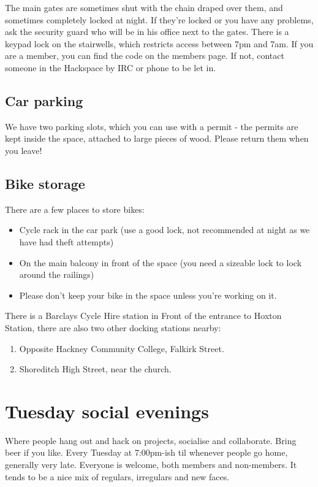 \documentclass[11pt,a5paper,twoside]{memoir}
\begin{document}
The main gates are sometimes shut with the chain draped over them, and sometimes completely locked at night. If they're locked or you have any problems, ask the security guard who will be in his office next to the gates. There is a keypad lock on the stairwells, which restricts access between 7pm and 7am. If you are a member, you can find the code on the members page. If not, contact someone in the Hackspace by IRC or phone to be let in.

\subsection{Car parking}

We have two parking slots, which you can use with a permit - the permits are kept inside the space, attached to large pieces of wood. Please return them when you leave!

\subsection{Bike storage}

There are a few places to store bikes:

\begin{itemize}
	\item Cycle rack in the car park (use a good lock, not recommended at night as we have had theft attempts)
	\item On the main balcony in front of the space (you need a sizeable lock to lock around the railings)
	\item Please don't keep your bike in the space unless you're working on it.
\end{itemize}

There is a Barclays Cycle Hire station in Front of the entrance to Hoxton Station, there are also two other docking stations nearby:

\begin{enumerate}
	\item Opposite Hackney Community College, Falkirk Street.
	\item Shoreditch High Street, near the church.
\end{enumerate}


\section{Tuesday social evenings}

Where people hang out and hack on projects, socialise and collaborate. Bring beer if you like. Every Tuesday at 7:00pm-ish til whenever people go home, generally very late. Everyone is welcome, both members and non-members. It tends to be a nice mix of regulars, irregulars and new faces.
\end{document}

